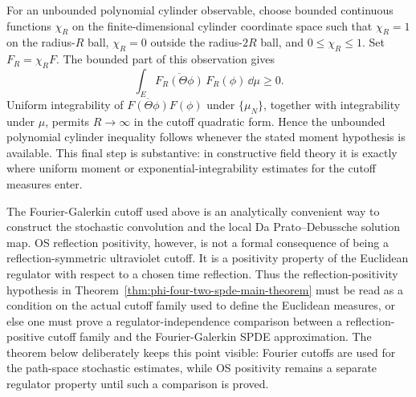 \begin{remark}
For an unbounded polynomial cylinder observable, choose bounded continuous
functions \(\chi_R\) on the finite-dimensional cylinder coordinate space
such that \(\chi_R=1\) on the radius-\(R\) ball, \(\chi_R=0\) outside the
radius-\(2R\) ball, and \(0\leq\chi_R\leq1\).  Set \(F_R=\chi_R F\).
The bounded part of this observation gives
\[
  \int_E \overline{F_R(\Theta\phi)}\,F_R(\phi)\,\dd\mu\geq0 .
\]
Uniform integrability of
\(\overline{F(\Theta\phi)}F(\phi)\) under \(\{\mu_N\}\), together with
integrability under \(\mu\), permits \(R\to\infty\) in the cutoff
quadratic form.  Hence the unbounded polynomial cylinder inequality follows
whenever the stated moment hypothesis is available.  This final step is
substantive: in constructive field theory it is exactly where uniform moment
or exponential-integrability estimates for the cutoff measures enter.
\end{remark}

\begin{remark}
\label{rem:spde-fourier-cutoff-os-regulator-separation}
The Fourier-Galerkin cutoff used above is an analytically convenient way to
construct the stochastic convolution and the local Da Prato--Debussche
solution map.  OS reflection positivity, however, is not a formal consequence
of being a reflection-symmetric ultraviolet cutoff.  It is a positivity
property of the Euclidean regulator with respect to a chosen time reflection.
Thus the reflection-positivity hypothesis in
Theorem~\ref{thm:phi-four-two-spde-main-theorem} must be read as a condition
on the actual cutoff family used to define the Euclidean measures, or else
one must prove a regulator-independence comparison between a
reflection-positive cutoff family and the Fourier-Galerkin SPDE
approximation.  The theorem below deliberately keeps this point visible:
Fourier cutoffs are used for the path-space stochastic estimates, while OS
positivity remains a separate regulator property until such a comparison is
proved.
\end{remark}


